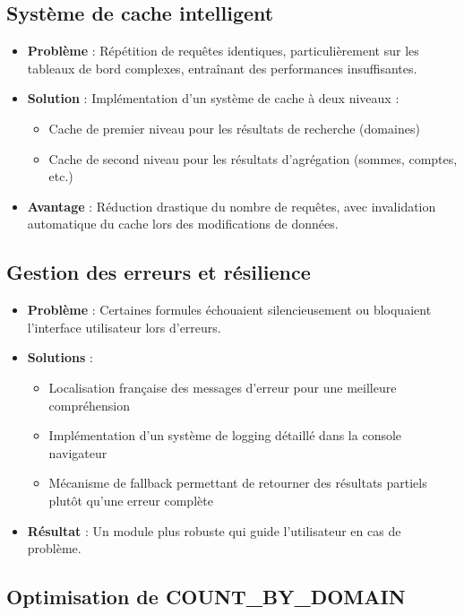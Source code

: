 \documentclass[12pt, a4paper]{article}
\begin{document}
\subsection{Système de cache intelligent}

\begin{itemize}
    \item \textbf{Problème} : Répétition de requêtes identiques, particulièrement sur les tableaux de bord complexes, entraînant des performances insuffisantes.
    \item \textbf{Solution} : Implémentation d'un système de cache à deux niveaux :
    \begin{itemize}
        \item Cache de premier niveau pour les résultats de recherche (domaines)
        \item Cache de second niveau pour les résultats d'agrégation (sommes, comptes, etc.)
    \end{itemize}
    \item \textbf{Avantage} : Réduction drastique du nombre de requêtes, avec invalidation automatique du cache lors des modifications de données.
\end{itemize}

\subsection{Gestion des erreurs et résilience}

\begin{itemize}
    \item \textbf{Problème} : Certaines formules échouaient silencieusement ou bloquaient l'interface utilisateur lors d'erreurs.
    \item \textbf{Solutions} : 
    \begin{itemize}
        \item Localisation française des messages d'erreur pour une meilleure compréhension
        \item Implémentation d'un système de logging détaillé dans la console navigateur
        \item Mécanisme de fallback permettant de retourner des résultats partiels plutôt qu'une erreur complète
    \end{itemize}
    \item \textbf{Résultat} : Un module plus robuste qui guide l'utilisateur en cas de problème.
\end{itemize}

\subsection{Optimisation de COUNT\_BY\_DOMAIN}
\end{document}
